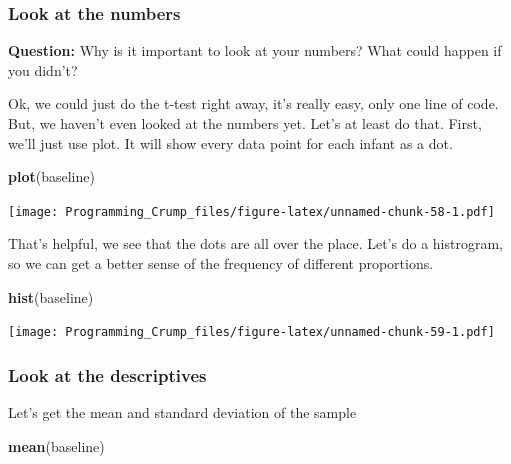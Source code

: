 \documentclass[]{book}
\newenvironment{Shaded}{\begin{snugshade}}{\end{snugshade}}
\newcommand{\KeywordTok}[1]{\textcolor[rgb]{0.13,0.29,0.53}{\textbf{{#1}}}}
\newcommand{\StringTok}[1]{\textcolor[rgb]{0.31,0.60,0.02}{{#1}}}
\newcommand{\NormalTok}[1]{{#1}}
\theoremstyle{definition}
\theoremstyle{definition}
\theoremstyle{definition}
\theoremstyle{remark}
\begin{document}
\begin{Shaded}
\end{Shaded}

\subsubsection{Look at the numbers}\label{look-at-the-numbers}

\textbf{Question:} Why is it important to look at your numbers? What
could happen if you didn't?

Ok, we could just do the t-test right away, it's really easy, only one
line of code. But, we haven't even looked at the numbers yet. Let's at
least do that. First, we'll just use plot. It will show every data point
for each infant as a dot.

\begin{Shaded}
\begin{Highlighting}[]
\KeywordTok{plot}\NormalTok{(baseline)}
\end{Highlighting}
\end{Shaded}

\texttt{[image: Programming\_Crump\_files/figure-latex/unnamed-chunk-58-1.pdf]}

That's helpful, we see that the dots are all over the place. Let's do a
histrogram, so we can get a better sense of the frequency of different
proportions.

\begin{Shaded}
\begin{Highlighting}[]
\KeywordTok{hist}\NormalTok{(baseline)}
\end{Highlighting}
\end{Shaded}

\texttt{[image: Programming\_Crump\_files/figure-latex/unnamed-chunk-59-1.pdf]}

\subsubsection{Look at the descriptives}\label{look-at-the-descriptives}

Let's get the mean and standard deviation of the sample

\begin{Shaded}
\begin{Highlighting}[]
\KeywordTok{mean}\NormalTok{(baseline)}
\end{Highlighting}
\end{Shaded}
\end{document}
